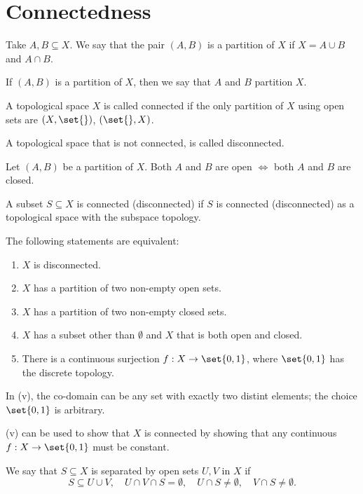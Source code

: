 \section{Connectedness}
\begin{ndfn}[Partition]
  Take $A, B \subseteq X$. We say that the pair $(A,B)$ is a partition of $X$ if $X = A \cup B$ and $A \cap B$.
\end{ndfn}
If $(A,B)$ is a partition of $X$, then we say that $A$ and $B$ partition $X$.

\begin{ndfn}[Connected]
  A topological space $X$ is called connected if the only partition of $X$ using open sets are $(X, \set{})$, $(\set{}, X)$.
\end{ndfn}
A topological space that is not connected, is called disconnected.

\begin{remark}
  Let $(A,B)$ be a partition of $X$. Both $A$ and $B$ are open $\iff$ both $A$ and $B$ are closed.
\end{remark}

\begin{ndfn}
  A subset $S \subseteq X$ is connected (disconnected) if $S$ is connected (disconnected) as a topological space with the subspace topology.
\end{ndfn}

\begin{nthm}
  The following statements are equivalent:
  \begin{enumerate}
  \item $X$ is disconnected.
  \item $X$ has a partition of two non-empty open sets.
  \item $X$ has a partition of two non-empty closed sets.
  \item $X$ has a subset other than $\emptyset$ and $X$ that is both open and closed.
  \item There is a continuous surjection $f: X \to \set{0,1}$, where $\set{0,1}$ has the discrete topology.
  \end{enumerate}
\end{nthm}

In (v), the co-domain can be any set with exactly two distint elements; the choice $\set{0,1}$ is arbitrary.

(v) can be used to show that $X$ is connected by showing that any continuous $f: X \to \set{0,1}$ must be constant.

\begin{ndfn}
  We say that $S \subseteq X$ is separated by open sets $U, V$ in $X$ if
  \begin{equation*}
    S \subseteq U \cup V,
    \quad U \cap V \cap S = \emptyset,
    \quad U \cap S \neq \emptyset,
    \quad V \cap S \neq \emptyset.
  \end{equation*}
\end{ndfn}

